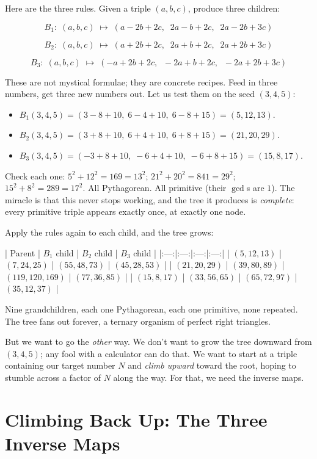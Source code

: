\documentclass[11pt,twoside,openright]{book}
\theoremstyle{definition}
\theoremstyle{remark}
\begin{document}
Here are the three rules. Given a triple $(a, b, c)$, produce three children:

\[B_1:\; (a, b, c) \;\longmapsto\; (a - 2b + 2c,\;\; 2a - b + 2c,\;\; 2a - 2b + 3c)\]

\[B_2:\; (a, b, c) \;\longmapsto\; (a + 2b + 2c,\;\; 2a + b + 2c,\;\; 2a + 2b + 3c)\]

\[B_3:\; (a, b, c) \;\longmapsto\; (-a + 2b + 2c,\;\; -2a + b + 2c,\;\; -2a + 2b + 3c)\]

These are not mystical formulae; they are concrete recipes. Feed in three numbers, get three new numbers out. Let us test them on the seed $(3, 4, 5)$:

\begin{itemize}
  \item $B_1(3,4,5) = (3 - 8 + 10,\; 6 - 4 + 10,\; 6 - 8 + 15) = (5, 12, 13)$.
  \item $B_2(3,4,5) = (3 + 8 + 10,\; 6 + 4 + 10,\; 6 + 8 + 15) = (21, 20, 29)$.
  \item $B_3(3,4,5) = (-3 + 8 + 10,\; -6 + 4 + 10,\; -6 + 8 + 15) = (15, 8, 17)$.
\end{itemize}

Check each one: $5^2 + 12^2 = 169 = 13^2$; $21^2 + 20^2 = 841 = 29^2$; $15^2 + 8^2 = 289 = 17^2$. All Pythagorean. All primitive (their $\gcd$s are $1$). The miracle is that this never stops working, and the tree it produces is \textit{complete}: every primitive triple appears exactly once, at exactly one node.

Apply the rules again to each child, and the tree grows:

| Parent | $B_1$ child | $B_2$ child | $B_3$ child |
|:---:|:---:|:---:|:---:|
| $(5,12,13)$ | $(7,24,25)$ | $(55,48,73)$ | $(45,28,53)$ |
| $(21,20,29)$ | $(39,80,89)$ | $(119,120,169)$ | $(77,36,85)$ |
| $(15,8,17)$ | $(33,56,65)$ | $(65,72,97)$ | $(35,12,37)$ |

Nine grandchildren, each one Pythagorean, each one primitive, none repeated. The tree fans out forever, a ternary organism of perfect right triangles.



But we want to go the \textit{other} way. We don't want to grow the tree downward from $(3,4,5)$; any fool with a calculator can do that. We want to start at a triple containing our target number $N$ and \textit{climb upward} toward the root, hoping to stumble across a factor of $N$ along the way. For that, we need the inverse maps.


\section{Climbing Back Up: The Three Inverse Maps}
\end{document}
